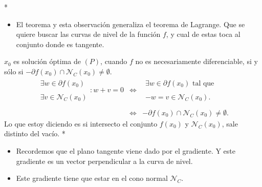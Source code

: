 \begin{paracol}{2}
\switchcolumn[1]*{\noindent\scriptsize
    \begin{itemize}
	\item El teorema y esta observación generaliza el teorema de Lagrange. Que se quiere buscar las curvas de nivel de la función $f$, y cual de estas toca al conjunto donde es tangente.
    \end{itemize}
}
\switchcolumn[0]\noindent
\begin{obs} $x_0$ es solución óptima de $(P)$, cuando $f$ no es necesariamente diferenciable, si y sólo si $-\partial f(x_0)\cap \mathcal{N}_C(x_0)\neq \emptyset$.
    $$
    \begin{array}{rcl}
	\begin{array}{l}
	\exists w \in \partial f(x_0)\\\\
	\exists v \in \mathcal{N}_C(x_0)
	\end{array}
	: w+v=0 &\iff&
	\begin{array}{l}
	    \exists w\in \partial f(x_0) \text{ tal que}\\\\
	    -w=v\in \mathcal{N}_C(x_0).
	\end{array}\\\\
	&\iff& -\partial f(x_0)\cap \mathcal{N}_C(x_0)\neq \emptyset.
    \end{array}
    $$
    Lo que estoy diciendo es si intersecto el conjunto $f(x_0)$ y $\mathcal{N}_C(x_0)$, sale distinto del vacío.
\switchcolumn[1]*{\noindent\scriptsize
    \begin{itemize}
	\item Recordemos que el plano tangente viene dado por el gradiente. Y este gradiente es un vector perpendicular a la curva de nivel.
	\item Este gradiente tiene que estar en el cono normal $\mathcal{N}_C$.
    \end{itemize}
}
\switchcolumn[0]\noindent
\end{obs}

\begin{center}
\end{center}




\end{paracol}

